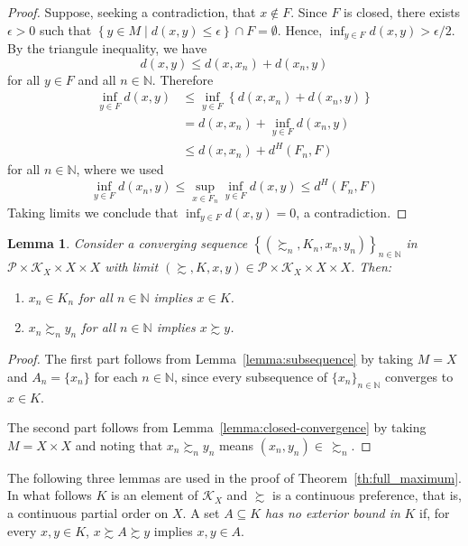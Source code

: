 \documentclass[12pt, oneside]{amsart}
\newtheorem{lemma}{Lemma}
\theoremstyle{definition}
\begin{document}
\begin{proof}
Suppose, seeking a contradiction, that $x \notin F$. Since $F$ is closed, there exists $\epsilon > 0$ such that $\left\{ y \in M \middle| d(x, y) \le \epsilon \right\} \cap F = \emptyset$. Hence, $\inf_{y \in F} d(x, y) > \epsilon/2$. By the triangule inequality, we have
\[
d(x, y) \le d(x, x_n) + d(x_n, y)
\]
for all $y \in F$ and all $n \in \mathbb{N}$. Therefore
\begin{align*}
\inf_{y \in F} d(x, y) &\le \inf_{y \in F} \left\{ d(x, x_n) + d(x_n, y) \right\} \\
&= d(x, x_n) + \inf_{y \in F} d(x_n, y)\\
&\leq d(x, x_n) + d^H(F_n, F)
\end{align*}
for all $n \in \mathbb{N}$, where we used
\[
\inf_{y \in F} d\left( x_n, y \right) \le \sup_{x \in F_n} \inf_{y \in F} d(x, y) \le d^H(F_n, F)
\]
Taking limits we conclude that $\inf_{y \in F} d(x, y) = 0$, a contradiction.
\end{proof}


\begin{lemma}
\label{lemma:Hausdorff_facts}
Consider a converging sequence $\left\{\left(\succsim_n, K_n, x_n, y_n\right)\right\}_{n \in \mathbb{N}}$ in $\mathcal{P}\times \mathcal{K}_X \times X \times X$ with limit $\left(\succsim, K, x, y\right) \in \mathcal{P}\times \mathcal{K}_X \times X \times X$. Then:
\begin{enumerate}
\item $x_n \in K_n$ for all $n \in \mathbb{N}$ implies $x \in K$.
\item $x_n \succsim_n y_n$ for all $n \in \mathbb{N}$ implies $x \succsim y$.
\end{enumerate}
\end{lemma}

\begin{proof}
The first part follows from Lemma~\ref{lemma:subsequence} by taking $M=X$ and $A_n = \{x_n\}$ for each $n \in \mathbb{N}$, since every subsequence of $\{x_n\}_{n \in \mathbb{N}}$ converges to $x \in K$.

The second part follows from Lemma~\ref{lemma:closed-convergence} by taking $M = X \times X$ and noting that $x_n \succsim_n y_n$ means $(x_n, y_n) \in \hspace{2pt} \succsim_n$.
\end{proof}


The following three lemmas are used in the proof of Theorem~\ref{th:full_maximum}. In what follows $K$ is an element of $\mathcal{K}_X$ and $\succsim$ is a continuous preference, that is, a continuous partial order on $X$. A set $A \subseteq K$ \textit{has no exterior bound in} $K$ if, for every $x,y\in K$, $x \succsim A \succsim y$ implies $x,y \in A$.
	
\end{document}
